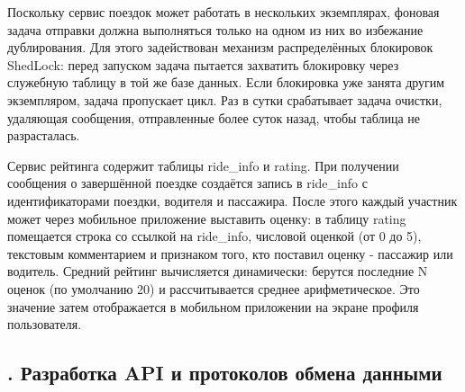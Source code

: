 {	\par \redline Поскольку сервис поездок может работать в нескольких экземплярах, фоновая задача отправки должна выполняться только на одном из них во избежание дублирования. Для этого задействован механизм распределённых блокировок ShedLock: перед запуском задача пытается захватить блокировку через служебную таблицу в той же базе данных. Если блокировка уже занята другим экземпляром, задача пропускает цикл. Раз в сутки срабатывает задача очистки, удаляющая сообщения, отправленные более суток назад, чтобы таблица не разрасталась.
	
	\par \redline Сервис рейтинга содержит таблицы ride\_info и rating. При получении сообщения о завершённой поездке создаётся запись в ride\_info с идентификаторами поездки, водителя и пассажира. После этого каждый участник может через мобильное приложение выставить оценку: в таблицу rating помещается строка со ссылкой на ride\_info, числовой оценкой (от 0 до 5), текстовым комментарием и признаком того, кто поставил оценку - пассажир или водитель. Средний рейтинг вычисляется динамически: берутся последние N оценок (по умолчанию 20) и рассчитывается среднее арифметическое. Это значение затем отображается в мобильном приложении на экране профиля пользователя.
	
	\par
}

\titlespace

\subsection*{ 
	\gostTitleFont
	\redline
	\thechaptercntr .\thesubchaptercntr \spc
	Разработка API и протоколов обмена данными
} \addtocounter{subchaptercntr}{1}

\titlespace

